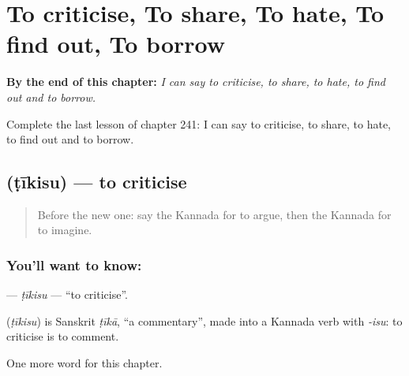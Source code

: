 
\chapter{To criticise, To share, To hate, To find out, To borrow}
\label{ch:ka-to-criticise-to-share-to-hate-to-find-out-to-borrow}

\begin{chapteropening}
\textbf{By the end of this chapter:} \emph{I can say to criticise, to share, to hate, to find out and to borrow.}

Complete the last lesson of chapter 241: I can say to criticise, to share, to hate, to find out and to borrow.
\end{chapteropening}

\section[\texorpdfstring{\kn{ಟೀಕಿಸು} (ṭīkisu)}{ಟೀಕಿಸು (ṭīkisu)}]{ (ṭīkisu) — to criticise}

\label{lesson:KA-C241-tikisu}



\begin{quote}
Before the new one: say the Kannada for to argue, then the Kannada for to imagine.
\end{quote}

\subsection*{You'll want to know: }
\textbf{} — \emph{ṭīkisu} — \textquotedblleft{}to criticise\textquotedblright{}.

\begin{cousinweb}
\textbf{} (\emph{ṭīkisu}) is Sanskrit \emph{ṭīkā}, \textquotedblleft{}a commentary\textquotedblright{}, made into a Kannada verb with \emph{-isu}: to criticise is to comment.
\end{cousinweb}

\begin{grammarlens}[title={What you've built}]
One more word for this chapter.
\end{grammarlens}

